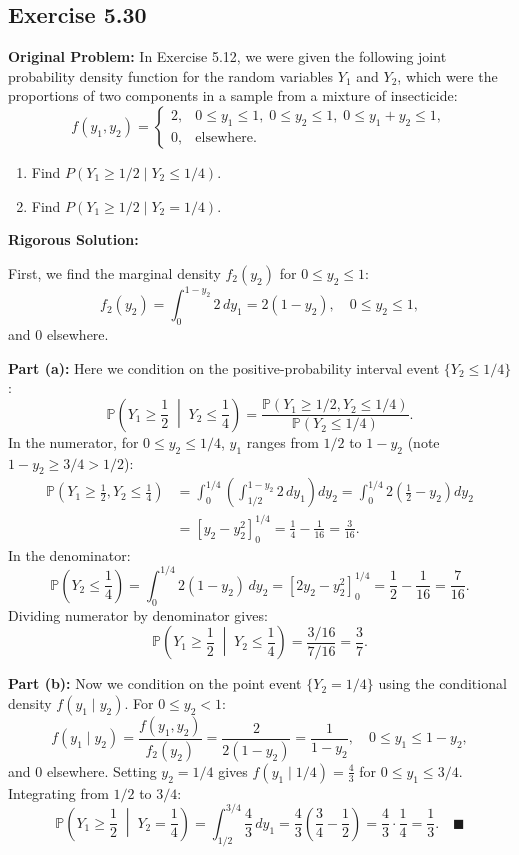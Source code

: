 \documentclass[11pt, letterpaper]{article}
\theoremstyle{definition}
\theoremstyle{remark}
\newcommand{\Prob}{\mathbb{P}}
\begin{document}
\subsection{Exercise 5.30}

\textbf{Original Problem:}
In Exercise 5.12, we were given the following joint probability density function for the random variables $Y_1$ and $Y_2$, which were the proportions of two components in a sample from a mixture of insecticide:
\[ f(y_1, y_2) = \begin{cases} 2, & 0 \le y_1 \le 1, \; 0 \le y_2 \le 1, \; 0 \le y_1 + y_2 \le 1, \\ 0, & \text{elsewhere.} \end{cases} \]
\begin{enumerate}[label=\textbf{\alph*}]
    \item Find $P(Y_1 \ge 1/2 \mid Y_2 \le 1/4)$.
    \item Find $P(Y_1 \ge 1/2 \mid Y_2 = 1/4)$.
\end{enumerate}

\textbf{Rigorous Solution:}

First, we find the marginal density $f_2(y_2)$ for $0 \le y_2 \le 1$:
\[ f_2(y_2) = \int_0^{1 - y_2} 2 \, dy_1 = 2(1 - y_2), \quad 0 \le y_2 \le 1, \]
and $0$ elsewhere.

\textbf{Part (a):} Here we condition on the positive-probability interval event $\{Y_2 \le 1/4\}$:
\[ \Prob\left(Y_1 \ge \frac{1}{2} \;\middle|\; Y_2 \le \frac{1}{4}\right) = \frac{\Prob(Y_1 \ge 1/2, Y_2 \le 1/4)}{\Prob(Y_2 \le 1/4)}. \]
In the numerator, for $0 \le y_2 \le 1/4$, $y_1$ ranges from $1/2$ to $1 - y_2$ (note $1 - y_2 \ge 3/4 > 1/2$):
\begin{align*}
    \Prob\left(Y_1 \ge \frac{1}{2}, Y_2 \le \frac{1}{4}\right) &= \int_0^{1/4} \left( \int_{1/2}^{1 - y_2} 2 \, dy_1 \right) dy_2 = \int_0^{1/4} 2\left(\frac{1}{2} - y_2\right) dy_2 \\
    &= \left[ y_2 - y_2^2 \right]_0^{1/4} = \frac{1}{4} - \frac{1}{16} = \frac{3}{16}.
\end{align*}
In the denominator:
\[ \Prob\left(Y_2 \le \frac{1}{4}\right) = \int_0^{1/4} 2(1 - y_2) \, dy_2 = \left[ 2y_2 - y_2^2 \right]_0^{1/4} = \frac{1}{2} - \frac{1}{16} = \frac{7}{16}. \]
Dividing numerator by denominator gives:
\[ \Prob\left(Y_1 \ge \frac{1}{2} \;\middle|\; Y_2 \le \frac{1}{4}\right) = \frac{3/16}{7/16} = \frac{3}{7}. \]

\textbf{Part (b):} Now we condition on the point event $\{Y_2 = 1/4\}$ using the conditional density $f(y_1 \mid y_2)$. For $0 \le y_2 < 1$:
\[ f(y_1 \mid y_2) = \frac{f(y_1, y_2)}{f_2(y_2)} = \frac{2}{2(1 - y_2)} = \frac{1}{1 - y_2}, \quad 0 \le y_1 \le 1 - y_2, \]
and $0$ elsewhere. Setting $y_2 = 1/4$ gives $f(y_1 \mid 1/4) = \frac{4}{3}$ for $0 \le y_1 \le 3/4$. Integrating from $1/2$ to $3/4$:
\[ \Prob\left(Y_1 \ge \frac{1}{2} \;\middle|\; Y_2 = \frac{1}{4}\right) = \int_{1/2}^{3/4} \frac{4}{3} \, dy_1 = \frac{4}{3}\left(\frac{3}{4} - \frac{1}{2}\right) = \frac{4}{3} \cdot \frac{1}{4} = \frac{1}{3}. \quad \blacksquare \]
\end{document}
